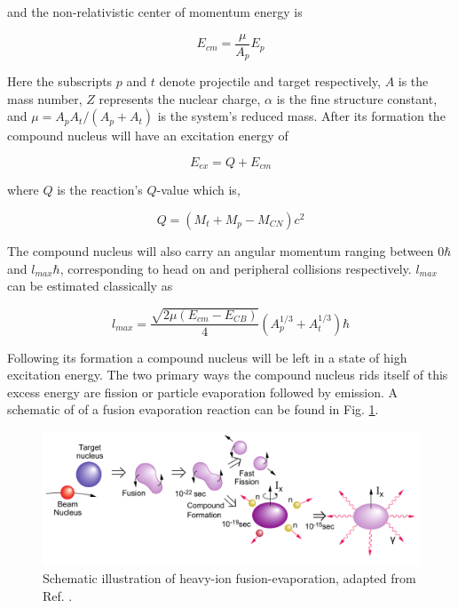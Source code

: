 and the non-relativistic center of momentum energy is

\begin{equation}
\label{eqn:cmf_en}
E_{cm} = \frac{\mu}{A_{p}}E_{p}
\end{equation}

Here the subscripts $p$ and $t$ denote projectile and target respectively, $A$ is the mass number, $Z$ represents the nuclear charge, $\alpha{}$ is the fine structure constant, and $\mu = A_{p}A_{t}/(A_{p}+A_{t})$ is the system's reduced mass. After its formation the compound nucleus will have an excitation energy of

\begin{equation}
\label{eqn:cn_ex}
E_{ex} = Q + E_{cm}
\end{equation}

where $Q$ is the reaction's $Q$-value which is,

\begin{equation}
\label{eqn:cn_form_qvalue}
Q = (M_t+M_p-M_{CN})c^2
\end{equation}

The compound nucleus will also carry an angular momentum ranging between $0 \hbar$ and $l_{max} \hbar$, corresponding to head on and peripheral collisions respectively. $l_{max}$ can be estimated classically as

\begin{equation}
\label{eqn:cn_lmax}
l_{max} = \frac{\sqrt{2\mu(E_{cm}-E_{CB})}}{4}(A^{1/3}_p + A^{1/3}_t)\hbar
\end{equation}

Following its formation a compound nucleus will be left in a state of high excitation energy. The two primary ways the compound nucleus rids itself of this excess energy are fission or particle evaporation followed by \gr{} emission. A schematic of of a fusion evaporation reaction can be found in Fig. \ref{fig:chp3-fus-evap-schem}.

\begin{figure}[h!]
	\centerline{\includegraphics[width=\textwidth]{./img/c3/fusion_evaporation_horizontal.pdf}}
	\caption{Schematic illustration of heavy-ion fusion-evaporation, adapted from Ref. \cite{gsBooklet}.}
	\label{fig:chp3-fus-evap-schem}
\end{figure}

